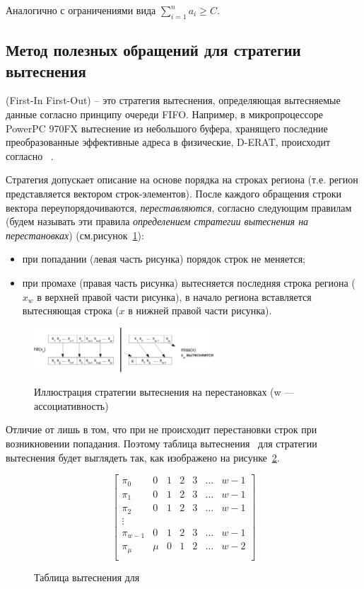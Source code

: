 Аналогично с ограничениями вида $\sum_{i=1}^n a_i \geqslant C$.


\subsection{Метод полезных обращений для стратегии вытеснения \FIFO}

\FIFO (First-In First-Out) -- это стратегия вытеснения, определяющая
вытесняемые данные согласно принципу очереди FIFO. Например, в
микропроцессоре PowerPC 970FX вытеснение из небольшого буфера,
хранящего последние преобразованные эффективные адреса в физические,
D-ERAT, происходит согласно \FIFO~\cite{PowerPC970FXUserManual}.

Стратегия \FIFO допускает описание на основе порядка на строках
региона (т.е. регион представляется вектором строк-элементов). После каждого
обращения строки вектора переупорядочиваются, \emph{переставляются}, согласно следующим правилам (будем называть эти правила \emph{определением стратегии вытеснения \FIFO на перестановках})
(см.рисунок~\ref{fifo1}):
\begin{itemize}
  \item при попадании (левая часть рисунка) порядок строк не меняется;
  \item при промахе (правая часть рисунка) вытесняется последняя строка региона ($x_w$ в верхней правой части рисунка), в начало региона вставляется вытесняющая строка ($x$ в нижней правой части рисунка).
\end{itemize}

\begin{figure}[h] \center
  \includegraphics[width=0.6\textwidth]{2.theor/fifo1}\\
  \caption{Иллюстрация стратегии вытеснения \FIFO на перестановках (w --- ассоциативность)}\label{fifo1}
\end{figure}

Отличие от \LRU лишь в том, что при \FIFO не происходит перестановки
строк при возникновении попадания. Поэтому таблица
вытеснения~\cite{policy_tables} для стратегии вытеснения \FIFO будет
выглядеть так, как изображено на рисунке~\ref{fifo_policy_table}.

\begin{figure}[h]
$$
  \left[
    \begin{array}{c|cccccc}
      \pi_0 & 0 & 1 & 2 & 3 & \dots & w{-}1 \\
      \pi_1 & 0 & 1 & 2 & 3 & \dots & w{-}1 \\
      \pi_2 & 0 & 1 & 2 & 3 & \dots & w{-}1 \\
      \vdots &  &  &  & & & \\
      \pi_{w-1} & 0 & 1 & 2 & 3 & \dots & w{-}1 \\
      \pi_{\mu} & \mu & 0 & 1 & 2 & \dots & w{-}2 \\
    \end{array}
  \right]
$$
\caption{Таблица вытеснения для \FIFO}\label{fifo_policy_table}
\end{figure}

